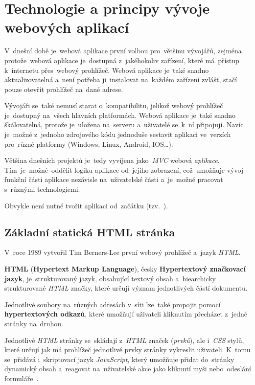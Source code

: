 \documentclass[11pt,a4paper]{report}
\begin{document}
    \chapter{Technologie a principy vývoje webových aplikací}
        V~dnešní době je~webová aplikace první volbou pro~většinu vývojářů, zejména protože~webová aplikace je~dostupná z~jakéhokoliv zařízení, které má~přístup k~internetu přes~webový prohlížeč. Webová aplikace je~také snadno aktualizovatelná a~není potřeba ji~instalovat na~každém zařízení zvlášť, stačí pouze otevřít prohlížeč na~dané adrese.
        
        Vývojáři se~také nemusí starat o~kompatibilitu, jelikož webový prohlížeč je~dostupný na~všech hlavních platformách. Webová aplikace je~také snadno škálovatelná, protože je~uložena na~serveru a~uživatelé se~k~ní připojují. Navíc je~možné z~jednoho zdrojového kódu jednoduše sestavit aplikaci ve~verzích pro~různé platformy (Windows, Linux, Android, IOS\dots).~\cite{adobe:webapp}

        Většina dnešních projektů je~tedy vyvíjena jako~\emph{MVC} webová \emph{aplikace}. Tím~je~možné~oddělit logiku aplikace od~jejího zobrazení, což~umožňuje vývoj funkční části aplikace nezávisle na~uživatelské části a~je~možné pracovat s~různými technologiemi.
        
        Obvykle není nutné tvořit aplikaci od~začátku (tzv.~). ~\cite{itnetworkBestPractices}

        \section{Základní statická HTML stránka}
            V~roce 1989 vytvořil Tim Berners-Lee první webový prohlížeč a~jazyk \emph{HTML}.
            
            \textbf{HTML} (\textbf{Hypertext Markup Language}), česky \textbf{Hypertextový značkovací jazyk}, je~strukturovaný jazyk, obsahující textový obsah a~hiearchicky strukturované \emph{HTML} značky, které určují význam jednotlivých částí dokumentu.
            
            Jednotlivé soubory na~různých adresách v~síti lze~také propojit pomocí \textbf{hypertextových odkazů}, které umožňují uživateli kliknutím přecházet z~jedné stránky na~druhou.

            Jednotlivé \emph{HTML} stránky se~skládají z~\emph{HTML} značek (\emph{prvků}), ale i~\emph{CSS} stylů, které určují jak má prohlížeč jednotlivé prvky stránky vykreslit uživateli. K~tomu se~přidává i~skriptovací jazyk \emph{JavaScript}, který umožňuje přidat do~stránky dynamický obsah a~reagovat na~uživatelské akce jako kliknutí myši nebo~odeslání formuláře~\cite{berners:1989:proposal}.
\end{document}
